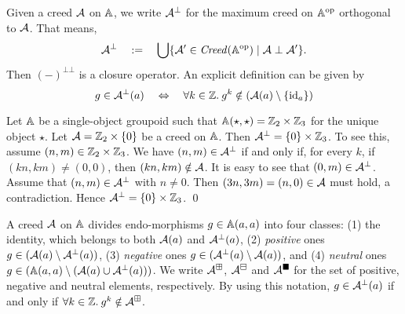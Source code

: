 Given a creed \( \mathcal{A} \) on \( \mathbb{A} \), we write \( \mathcal{A}^\bot \) for the maximum creed on \( \mathbb{A}^{\mathrm{op}} \) orthogonal to \( \mathcal{A} \).
That means,
\begin{equation*}
    \mathcal{A}^\bot
    \quad:=\quad
    \bigcup \{ \mathcal{A}' \in \mathit{Creed}(\mathbb{A}^{\mathrm{op}}) \mid \mathcal{A} \mathrel{\bot} \mathcal{A}' \}.
\end{equation*}
Then \( ({-})^{\bot\bot} \) is a closure operator.
An explicit definition can be given by
\begin{equation*}
    g \in \mathcal{A}^\bot(a)
    \quad\Leftrightarrow\quad
    \forall k \in \mathbb{Z}.\: g^k \notin (\mathcal{A}(a) \setminus \{ \mathrm{id}_a \})
\end{equation*}

\begin{example}
    Let \( \mathbb{A} \) be a single-object groupoid such that \( \mathbb{A}(\star, \star) = \mathbb{Z}_2 \times \mathbb{Z}_3 \) for the unique object \( \star \).
    Let \( \mathcal{A} = \mathbb{Z}_2 \times \{0\} \) be a creed on \( \mathbb{A} \).
    Then \( \mathcal{A}^\bot = \{0\}\times \mathbb{Z}_3 \).
    To see this, assume \( (n,m) \in \mathbb{Z}_2 \times \mathbb{Z}_3 \).
    We have \( (n,m) \in \mathcal{A}^\bot \) if and only if, for every \( k \), if \( (kn, km) \neq (0,0) \), then \( (kn, km) \notin \mathcal{A} \).
    It is easy to see that \( (0,m) \in \mathcal{A}^\bot \).
    Assume that \( (n,m) \in \mathcal{A}^\bot \) with \( n \neq 0 \).
    Then \( (3n, 3m) = (n, 0) \in \mathcal{A} \) must hold, a contradiction.
    Hence \( \mathcal{A}^\bot = \{ 0 \} \times \mathbb{Z}_3 \).
    \qed
\end{example}

A creed \( \mathcal{A} \) on \( \mathbb{A} \) divides endo-morphisms \( g \in \mathbb{A}(a,a) \) into four classes:
(1) the identity, which belongs to both \( \mathcal{A}(a) \) and \( \mathcal{A}^\bot(a) \),
(2) \emph{positive} ones \( g \in (\mathcal{A}(a) \setminus \mathcal{A}^\bot(a)) \),
(3) \emph{negative} ones \( g \in (\mathcal{A}^\bot(a) \setminus \mathcal{A}(a)) \), and
(4) \emph{neutral} ones \( g \in (\mathbb{A}(a,a) \setminus (\mathcal{A}(a) \cup \mathcal{A}^\bot(a))) \).
We write \( \mathcal{A}^{\boxplus} \), \( \mathcal{A}^{\boxminus} \) and \( \mathcal{A}^\blacksquare \) for the set of positive, negative and neutral elements, respectively.
By using this notation, \( g \in \mathcal{A}^\bot(a) \) if and only if \( \forall k \in \mathbb{Z}.\: g^k \notin \mathcal{A}^\boxplus \).

